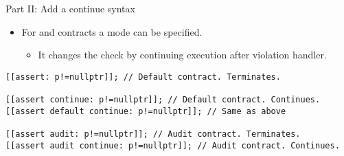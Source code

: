 \begin{frame}[t,fragile]{Part II: Add a continue syntax}
\begin{itemize}
  \item For  and  contracts a  mode
        can be specified.
    \begin{itemize}
      \item It changes the check by continuing execution after violation handler.
    \end{itemize}
\end{itemize}
\begin{lstlisting}
[[assert: p!=nullptr]]; // Default contract. Terminates.

[[assert continue: p!=nullptr]]; // Default contract. Continues.
[[assert default continue: p!=nullptr]]; // Same as above

[[assert audit: p!=nullptr]]; // Audit contract. Terminates.
[[assert audit continue: p!=nullptr]]; // Audit contract. Continues.
\end{lstlisting}
\end{frame}
